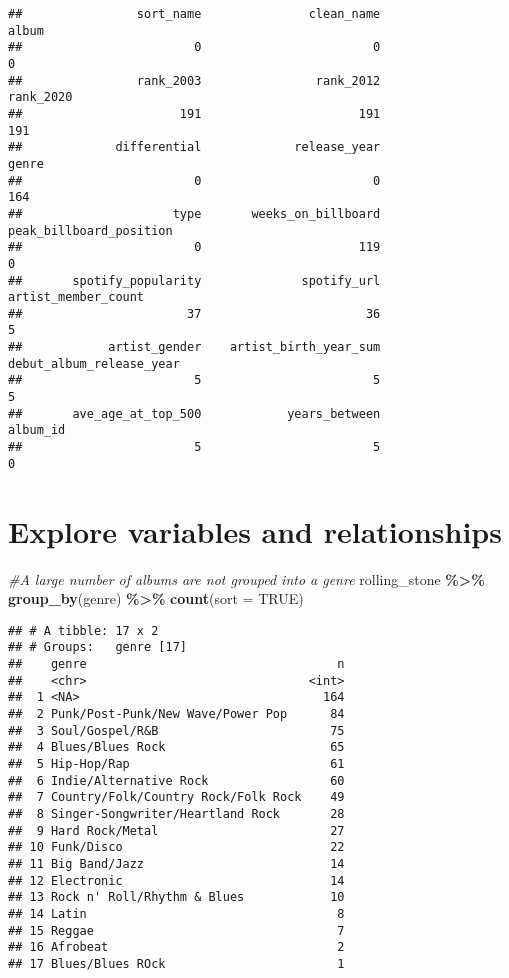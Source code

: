 \documentclass[
]{article}
\newenvironment{Shaded}{\begin{snugshade}}{\end{snugshade}}
\newcommand{\AttributeTok}[1]{\textcolor[rgb]{0.13,0.29,0.53}{#1}}
\newcommand{\CommentTok}[1]{\textcolor[rgb]{0.56,0.35,0.01}{\textit{#1}}}
\newcommand{\ConstantTok}[1]{\textcolor[rgb]{0.56,0.35,0.01}{#1}}
\newcommand{\FunctionTok}[1]{\textcolor[rgb]{0.13,0.29,0.53}{\textbf{#1}}}
\newcommand{\NormalTok}[1]{#1}
\newcommand{\SpecialCharTok}[1]{\textcolor[rgb]{0.81,0.36,0.00}{\textbf{#1}}}
\begin{document}
\begin{verbatim}
##                sort_name               clean_name                    album 
##                        0                        0                        0 
##                rank_2003                rank_2012                rank_2020 
##                      191                      191                      191 
##             differential             release_year                    genre 
##                        0                        0                      164 
##                     type       weeks_on_billboard  peak_billboard_position 
##                        0                      119                        0 
##       spotify_popularity              spotify_url      artist_member_count 
##                       37                       36                        5 
##            artist_gender    artist_birth_year_sum debut_album_release_year 
##                        5                        5                        5 
##       ave_age_at_top_500            years_between                 album_id 
##                        5                        5                        0
\end{verbatim}

\section{Explore variables and
relationships}\label{explore-variables-and-relationships}

\begin{Shaded}
\begin{Highlighting}[]
\CommentTok{\#A large number of albums are not grouped into a genre}
\NormalTok{rolling\_stone }\SpecialCharTok{\%\textgreater{}\%}
  \FunctionTok{group\_by}\NormalTok{(genre) }\SpecialCharTok{\%\textgreater{}\%}
  \FunctionTok{count}\NormalTok{(}\AttributeTok{sort =} \ConstantTok{TRUE}\NormalTok{)}
\end{Highlighting}
\end{Shaded}

\begin{verbatim}
## # A tibble: 17 x 2
## # Groups:   genre [17]
##    genre                                   n
##    <chr>                               <int>
##  1 <NA>                                  164
##  2 Punk/Post-Punk/New Wave/Power Pop      84
##  3 Soul/Gospel/R&B                        75
##  4 Blues/Blues Rock                       65
##  5 Hip-Hop/Rap                            61
##  6 Indie/Alternative Rock                 60
##  7 Country/Folk/Country Rock/Folk Rock    49
##  8 Singer-Songwriter/Heartland Rock       28
##  9 Hard Rock/Metal                        27
## 10 Funk/Disco                             22
## 11 Big Band/Jazz                          14
## 12 Electronic                             14
## 13 Rock n' Roll/Rhythm & Blues            10
## 14 Latin                                   8
## 15 Reggae                                  7
## 16 Afrobeat                                2
## 17 Blues/Blues ROck                        1
\end{verbatim}
\end{document}
